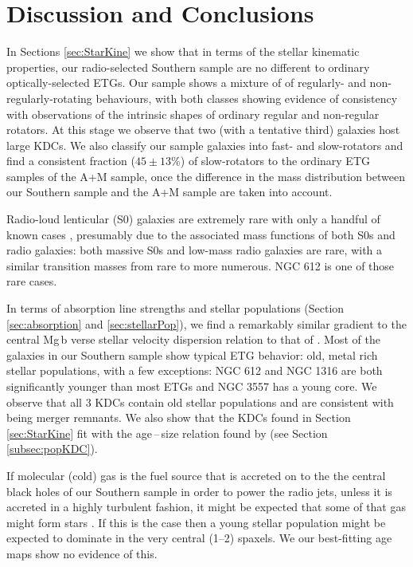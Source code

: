\documentclass[a4paper,fleqn,usenatbib]{mnras}
\begin{document}
\section{Discussion and Conclusions}
	\label{sec:discuss}
	In Sections \ref{sec:StarKine} we show that in terms of the stellar kinematic properties, our radio-selected Southern sample are no different to ordinary optically-selected ETGs. Our sample shows a mixture of of regularly- and non-regularly-rotating behaviours, with both classes showing evidence of consistency with observations of the intrinsic shapes of ordinary regular and non-regular rotators. At this stage we observe that two (with a tentative third) galaxies host large KDCs. We also classify our sample galaxies into fast- and slow-rotators and find a consistent fraction ($45\pm13$\%) of slow-rotators to the ordinary ETG samples of the A+M sample, once the difference in the mass distribution between our Southern sample and the A+M sample are taken into account.

	Radio-loud lenticular (S0) galaxies are extremely rare with only a handful of known cases \citep[e.g.][]{Heckman1982, Morganti2011}, presumably due to the associated mass functions of both S0s and radio galaxies: both massive S0s and low-mass radio galaxies are rare, with a similar transition masses from rare to more numerous. NGC 612 is one of those rare cases.

	In terms of absorption line strengths and stellar populations (Section \ref{sec:absorption} and \ref{sec:stellarPop}), we find a remarkably similar gradient to the central Mg\,b verse stellar velocity dispersion relation to that of \citet{Ziegler1997}. Most of the galaxies in our Southern sample show typical ETG behavior: old, metal rich stellar populations, with a few exceptions: NGC 612 and NGC 1316 are both significantly younger than most ETGs and NGC 3557 has a young core. We observe that all 3 KDCs contain old stellar populations and are consistent with being merger remnants. We also show that the KDCs found in Section \ref{sec:StarKine} fit with the age\,--\,size relation found by \citet{Kuntschner2010} (see Section \ref{subsec:popKDC}).

	If molecular (cold) gas is the fuel source that is accreted on to the the central black holes of our Southern sample in order to power the radio jets, unless it is accreted in a highly turbulent fashion, it might be expected that some of that gas might form stars \citep[e.g.][]{Collin1999, Diamond-Stanic2012, LaMassa2013}. If this is the case then a young stellar population might be expected to dominate in the very central (1--2) spaxels. We our best-fitting age maps show no evidence of this. 	
\end{document}
